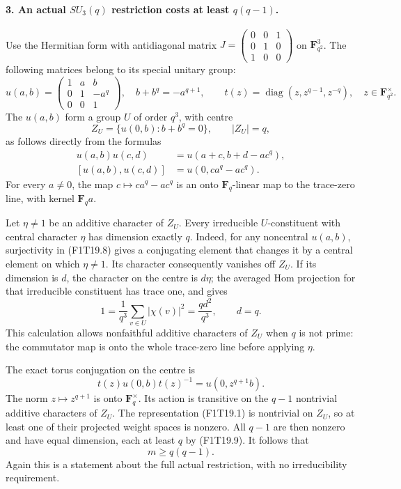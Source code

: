 \paragraph{3. An actual \(SU_3(q)\) restriction costs at least \(q(q-1)\).}
Use the Hermitian form with antidiagonal matrix
\(J=\left(\begin{smallmatrix}0&0&1\\0&1&0\\1&0&0\end{smallmatrix}\right)\)
on \(\mathbf F_{q^2}^3\). The following matrices belong
to its special unitary group:
\[
 u(a,b)=\begin{pmatrix}1&a&b\\0&1&-a^q\\0&0&1\end{pmatrix},
 \quad b+b^q=-a^{q+1},
 \qquad
 t(z)=\operatorname{diag}(z,z^{q-1},z^{-q}),
 \quad z\in\mathbf F_{q^2}^{\times}.
 \tag{F1T19.6}
\]
The \(u(a,b)\) form a group \(U\) of order \(q^3\),
with centre
\[
 Z_U=\{u(0,b):b+b^q=0\},\qquad |Z_U|=q,
 \tag{F1T19.7}
\]
as follows directly from the formulas
\[
 \begin{split}
 u(a,b)u(c,d)&=u(a+c,b+d-ac^q),\\
 [u(a,b),u(c,d)]&=u(0,ca^q-ac^q).
 \end{split}
 \tag{F1T19.8}
\]
For every \(a\ne0\), the map
\(c\mapsto ca^q-ac^q\) is an onto \(\mathbf F_q\)-linear
map to the trace-zero line, with kernel \(\mathbf F_q a\).

Let \(\eta\ne1\) be an additive character of \(Z_U\).
Every irreducible \(U\)-constituent with central
character \(\eta\) has dimension exactly \(q\).
Indeed, for any noncentral \(u(a,b)\), surjectivity
in (F1T19.8) gives a conjugating element that changes
it by a central element on which \(\eta\ne1\).
Its character consequently vanishes off \(Z_U\).
If its dimension is \(d\), the character on the centre
is \(d\eta\); the averaged Hom projection for that
irreducible constituent has trace one, and gives
\[
                 1=\frac1{q^3}\sum_{v\in U}|\chi(v)|^2
                    =\frac{qd^2}{q^3},
                 \qquad d=q.
 \tag{F1T19.9}
\]
This calculation allows nonfaithful additive characters
of \(Z_U\) when \(q\) is not prime: the commutator map
is onto the whole trace-zero line before applying
\(\eta\).

The exact torus conjugation on the centre is
\[
          t(z)u(0,b)t(z)^{-1}=u(0,z^{q+1}b).
 \tag{F1T19.10}
\]
The norm \(z\mapsto z^{q+1}\) is onto
\(\mathbf F_q^\times\). Its action is transitive on
the \(q-1\) nontrivial additive characters of \(Z_U\).
The representation (F1T19.1) is nontrivial on \(Z_U\),
so at least one of their projected weight spaces is
nonzero. All \(q-1\) are then nonzero and have equal
dimension, each at least \(q\) by (F1T19.9).
It follows that
\[
                              m\ge q(q-1).
 \tag{F1T19.11}
\]
Again this is a statement about the full actual
restriction, with no irreducibility requirement.

